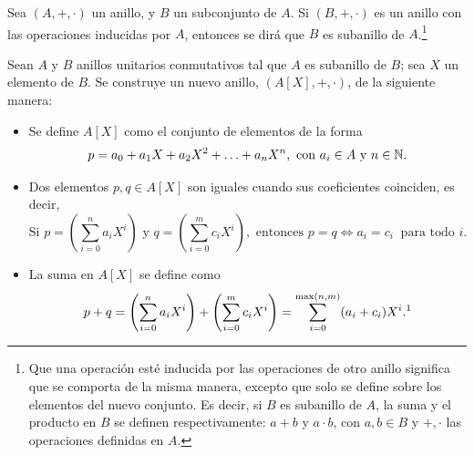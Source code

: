 \begin{deff}[Subanillo]{\cite[p.~33]{GamboaAnillos}}
    Sea $(A,+,\cdot)$ un anillo, y $B$ un subconjunto de $A$. Si $(B,+,\cdot)$ es un anillo con las operaciones inducidas por $A$, entonces se dirá que $B$ es subanillo de $A$.\footnote{Que una operación esté inducida por las operaciones de otro anillo significa que se comporta de la misma manera, excepto que solo se define sobre los elementos del nuevo conjunto. Es decir, si $B$ es subanillo de $A$, la suma y el producto en $B$ se definen respectivamente: $a + b$ y $a \cdot b$, con $a,b\in B$ y $+,\cdot$ las operaciones definidas en $A$.}
\end{deff}



\begin{deff}{\cite[p.~51]{Rosenberger}}\label{definion:polinomios}
    Sean $A$ y $B$ anillos unitarios conmutativos tal que $A$ es subanillo de $B$; sea $X$ un elemento de $B$. Se construye un nuevo anillo, $(A[X], +,\cdot)$, de la siguiente manera:

    \begin{itemize}
        \item Se define $A[X]$ como el conjunto de elementos de la forma  
        \[ p = a_0 + a_1X + a_2X^2 + \ldots + a_nX^n , \text{ con }  a_i \in A  \text{ y }  n \in \mathbb{N}.\]
        
        \item Dos elementos $p,q \in A[X]$ son iguales cuando sus coeficientes coinciden, es decir,
        \[
        \text{Si } p = \left(\sum\limits_{i=0}^{n} a_i X^i\right) \text{ y }q = \left(\sum\limits_{i=0}^{m} c_i X^i\right), \text{ entonces } p = q \iff a_i = c_i \ \text{ para todo $i$.}  
        \]
        
        \item
            
                La suma en $A[X]$ se define como 
                \[
                    p + q = \left(\sum\limits_{i=0}^n a_i X^i\right) + \left(\sum\limits_{i=0}^m c_i X^i\right) = \sum\limits_{i=0}^{\text{max}(n,m)} (a_i + c_i)X^i.
                    \text{\footnotemark}
                \]
            \vspace{-1em}
        

\end{itemize}
\end{deff}
